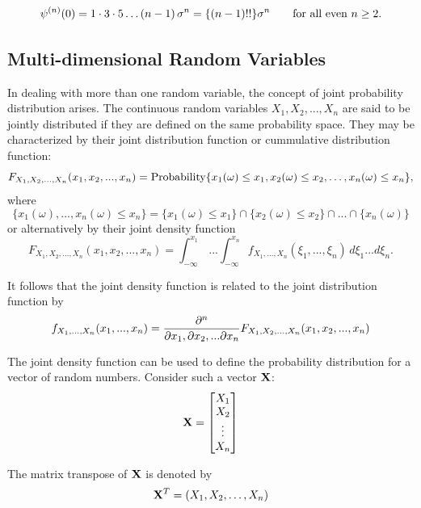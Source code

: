 \begin{equation}\psi^{(n)}(0) = 1\cdot3\cdot5 \hdots (n-1)\, \sigma^n = \{(n-1)!!\} \sigma^n \quad\quad \hbox{for all even $n\ge2$.}\label{eqn:moments}\end{equation}

\subsection{Multi-dimensional Random Variables}
In dealing with more than one random variable, the concept of joint probability distribution arises. The continuous random variables $X_1, X_2, ... , X_n$ are said to be {\elevenit jointly distributed} if they are defined on the same probability space. They may be characterized by their {\elevenit joint distribution function} or {\elevenit cummulative distribution function}:
$$F_{X_1, X_2, ..., X_n}(x_1, x_2, ..., x_n) = \hbox{Probability}\{x_1(\omega) \le x_1, x_2(\omega) \le x_2,\hdots,x_n(\omega)\le x_n \},$$ where 
$$\{ x_1(\omega), ..., x_n(\omega) \le x_n\} = \{x_1(\omega) \le x_1\} \cap \{x_2(\omega)\le x_2\} \cap ... \cap \{x_n(\omega)\}$$ or alternatively by their {\elevenit joint density function}
$$F_{X_1, X_2, ..., X_n}(x_1, x_2, ..., x_n) = \int_{-\infty}^{x_1}\, ... \int_{-\infty}^{x_n} f_{X_1, ..., X_n}(\xi_1, ..., \xi_n) \, d\xi_1 ... d\xi_n.$$

It follows that the joint density function is related to the joint distribution function by 
$$f_{X_1, ..., X_n}(x_1, ..., x_n)  = {\partial^n \over \partial x_1, \partial x_2, ... \partial x_n} F_{X_1, X_2, ..., X_n} (x_1, x_2, ..., x_n)$$
 
The joint density function can be used to define the probability distribution for a vector of random numbers. Consider such a vector ${\bf X}$:\\

$${\bf X} =  
\begin{bmatrix}
           X_{1} \\
           X_{2} \\
           \vdots \\
           X_{n}
\end{bmatrix}$$

The matrix transpose of ${\bf X}$  is denoted by $${\bf X}^T  = (X_1, X_2, \hdots, X_n)$$

